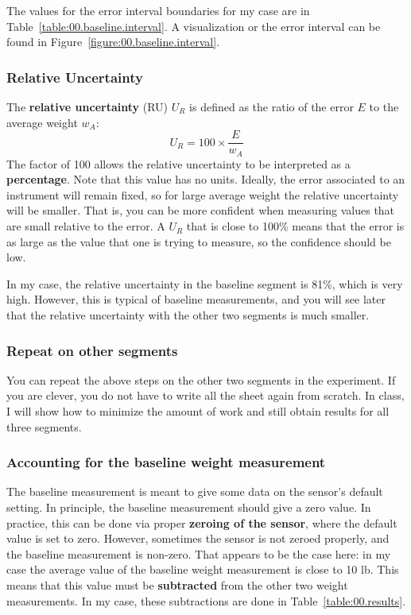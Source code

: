 The values for the error interval boundaries for my case are in Table~\ref{table:00.baseline.interval}. A visualization or the error interval can be found in Figure~\ref{figure:00.baseline.interval}.
%
\subsubsection{Relative Uncertainty}
%
The \textbf{relative uncertainty} (RU) $U_{R}$ is defined as the ratio of the error $E$ to the average weight $w_{A}$:
\begin{equation}
    U_{R} = 100 \times \frac{E}{w_{A}}
\end{equation}
The factor of 100 allows the relative uncertainty to be interpreted as a \textbf{percentage}. Note that this value has no units. Ideally, the error associated to an instrument will remain fixed, so for large average weight the relative uncertainty will be smaller. That is, you can be more confident when measuring values that are small relative to the error. A $U_{R}$ that is close to 100\% means that the error is as large as the value that one is trying to measure, so the confidence should be low.

In my case, the relative uncertainty in the baseline segment is 81\%, which is very high. However, this is typical of baseline measurements, and you will see later that the relative uncertainty with the other two segments is much smaller.
%
\subsubsection{Repeat on other segments}
%
You can repeat the above steps on the other two segments in the experiment. If you are clever, you do not have to write all the sheet again from scratch. In class, I will show how to minimize the amount of work and still obtain results for all three segments.
%
\subsubsection{Accounting for the baseline weight measurement}
%
The baseline measurement is meant to give some data on the sensor's default setting. In principle, the baseline measurement should give a zero value. In practice, this can be done via proper \textbf{zeroing of the sensor}, where the default value is set to zero. However, sometimes the sensor is not zeroed properly, and the baseline measurement is non-zero. That appears to be the case here: in my case the average value of the baseline weight measurement is close to 10 lb. This means that this value must be \textbf{subtracted} from the other two weight measurements. In my case, these subtractions are done in Table~\ref{table:00.results}.
%
